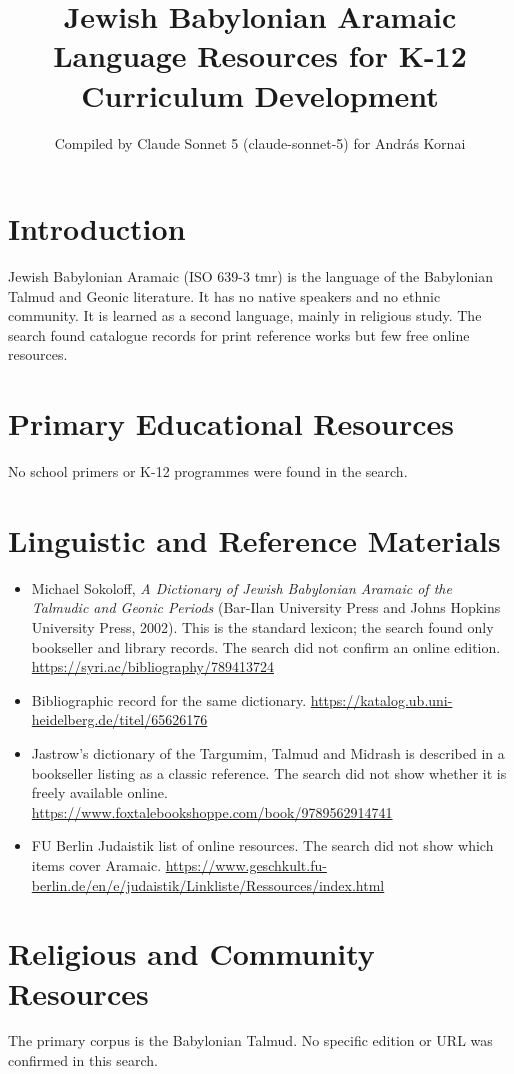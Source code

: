 \documentclass[12pt]{article}
\title{Jewish Babylonian Aramaic Language Resources for K-12 Curriculum Development}
\author{Compiled by Claude Sonnet 5 (claude-sonnet-5) for Andr\'as Kornai}
\date{}
\begin{document}
\maketitle

\section{Introduction}
Jewish Babylonian Aramaic (ISO 639-3 tmr) is the language of the Babylonian Talmud and Geonic literature. It has no native speakers and no ethnic community. It is learned as a second language, mainly in religious study. The search found catalogue records for print reference works but few free online resources.

\section{Primary Educational Resources}
No school primers or K-12 programmes were found in the search.

\section{Linguistic and Reference Materials}
\begin{itemize}
\item Michael Sokoloff, \emph{A Dictionary of Jewish Babylonian Aramaic of the Talmudic and Geonic Periods} (Bar-Ilan University Press and Johns Hopkins University Press, 2002). This is the standard lexicon; the search found only bookseller and library records. The search did not confirm an online edition. \url{https://syri.ac/bibliography/789413724}
\item Bibliographic record for the same dictionary. \url{https://katalog.ub.uni-heidelberg.de/titel/65626176}
\item Jastrow's dictionary of the Targumim, Talmud and Midrash is described in a bookseller listing as a classic reference. The search did not show whether it is freely available online. \url{https://www.foxtalebookshoppe.com/book/9789562914741}
\item FU Berlin Judaistik list of online resources. The search did not show which items cover Aramaic. \url{https://www.geschkult.fu-berlin.de/en/e/judaistik/Linkliste/Ressources/index.html}
\end{itemize}

\section{Religious and Community Resources}
The primary corpus is the Babylonian Talmud. No specific edition or URL was confirmed in this search.
\end{document}
